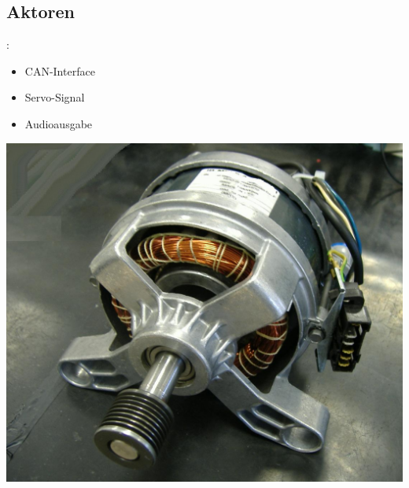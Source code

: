 \documentclass{beamer}
\begin{document}
\subsection{Aktoren}
\begin{frame}{\insertsection: \insertsubsection}
\begin{minipage}{0.45\linewidth}
	
	\begin{itemize}
		\item CAN-Interface
		\item Servo-Signal
		\item Audioausgabe
	\end{itemize}
\end{minipage} \quad
\begin{minipage}{0.45\linewidth}
	\includegraphics[width=\linewidth]{motor}
\end{minipage}
\end{frame}
\end{document}
